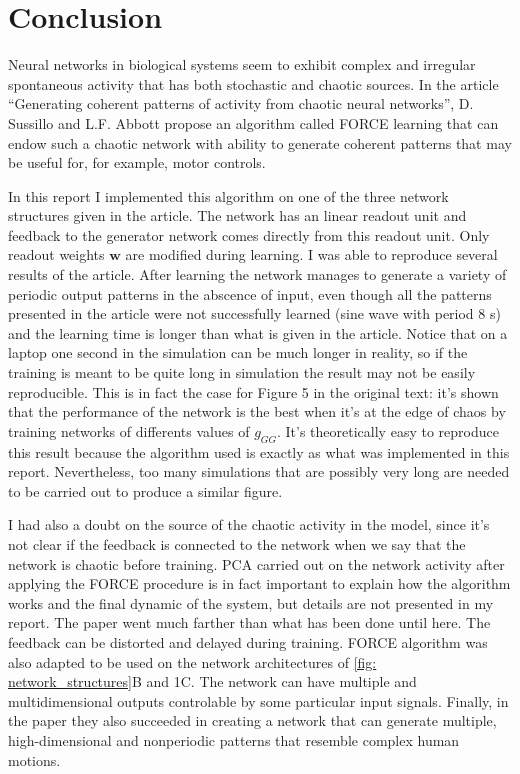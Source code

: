 \section{Conclusion}

Neural networks in biological systems seem to exhibit complex and
irregular spontaneous activity that has both stochastic and chaotic sources.
In the article ``Generating coherent patterns of activity from
chaotic neural networks'', D. Sussillo and L.F. Abbott propose an 
algorithm called FORCE learning that can endow such
a chaotic network with ability to generate coherent patterns that
may be useful for, for example, motor controls.

In this report I implemented this algorithm on one of the three
network structures given in the article. The network has an linear readout
unit and feedback to the generator network comes directly from this
readout unit. Only readout weights $\mathbf{w}$ are modified during learning.
I was able to reproduce several results of the article. After
learning the network manages to generate a variety of periodic
output patterns in the abscence of input, even though all the patterns
presented in the article were not successfully learned 
(sine wave with period 8 s) and the learning time is longer than what
is given in the article. Notice that on a laptop one second in the 
simulation can be much longer in reality, so if the training is meant
to be quite long in simulation the result may not be easily reproducible.
This is in fact the case for Figure 5 in the original text: it's shown
that the performance of the network is the best when it's at the
edge of chaos by training networks of differents values of $g_{GG}$.
It's theoretically easy to reproduce this result because the algorithm
used is exactly as what was implemented in this report. Nevertheless,
too many simulations that are possibly very long are needed to be
carried out to produce a similar figure.

I had also a doubt on the source of the chaotic activity in the model,
since it's not clear if the feedback is connected to the network 
when we say that the network is chaotic before training. PCA carried out on 
the network activity after applying the FORCE procedure is in fact important
to explain how the algorithm works and the final dynamic of the system,
but details are not presented in my report. The paper went much farther
than what has been done until here. The feedback can be distorted and
delayed during training. FORCE algorithm was also adapted
to be used on the network architectures of \autoref{fig: network_structures}B
and 1C. The network can have multiple and multidimensional outputs 
controlable by some particular input signals. Finally, in the paper they
also succeeded in creating a network that can generate multiple,
high-dimensional and nonperiodic patterns that resemble complex human motions.

